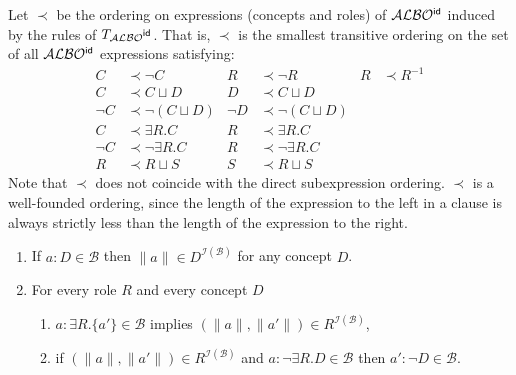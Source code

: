 \documentclass[leqno
,pdflatex
,prodmode
,acmtocl
]{acmsmall}
\newcommand{\mathcmd}[1]{\ensuremath{#1}\xspace}
\newcommand{\dlfont}{\mathcal}
\newcommand{\dl}[1]{\mathcmd{\dlfont{#1}}}
\newcommand{\idRole}{\mathcmd{\textsf{\upshape\mdseries id}}}
\newcommand{\ALBOid}{\dl{ALBO\smash[t]{\mbox{${}^{\idRole}$}}}}
\def\Not{\neg}
\def\Or{\sqcup}
\newcommand{\branch}[1]{\seg{#1}}
\newcommand{\seg}[1]{\mathcmd{\mathcal{#1}}}
\newcommand{\indiv}{a}
\newcommand{\I}{\mathcal{I}}
\newcommand{\IB}{{\I(\branch{B})}}
\begin{document}
Let $\prec$ be the ordering on expressions (concepts and roles) of \ALBOid induced by the rules of $T_\ALBOid$.
That is, $\prec$ is the smallest transitive ordering
on the set of all \ALBOid expressions 
satisfying:
\begin{align*}
 C & \prec \Not C & R &\prec \Not R&
 R & \prec R^{-1}\\
 C & \prec C\Or D & D & \prec C\Or D\\
 \Not C & \prec \Not(C\Or D) & \Not D &\prec \Not(C\Or D)\\
 C &\prec \exists R.C & R & \prec \exists R.C\\
 \Not C &\prec \Not\exists R.C & R & \prec \Not\exists R.C\\
 R & \prec R\Or S & S & \prec R\Or S
\end{align*}
Note that $\prec$ does not coincide with the direct subexpression ordering. $\prec$ is a well-founded ordering, 
since the length of the expression to the left in a clause is always strictly less than the 
length of the expression to the right.
\begin{lemma}\label{lemma: reflection}
\begin{enumerate}[(1)]
\item\label{prop: C}
 If $\indiv:D\in\branch{B}$ then $\|\indiv\|\in D^\IB$ for any concept $D$. 
\item\label{prop: R} For every role $R$ 
                     and every concept $D$
    \begin{enumerate}
        \item\label{prop: R: 1} $\indiv:\exists R.\{\indiv'\}\in\branch{B}$ implies $(\|\indiv\|,\|\indiv'\|)\in R^\IB$,
        \item\label{prop: R: 2} if $(\|\indiv\|,\|\indiv'\|)\in R^\IB$ and $\indiv:\Not\exists R.D\in\branch{B}$
              then $\indiv':\Not D\in\branch{B}$.
    \end{enumerate}
\end{enumerate}
\end{lemma}
\end{document}
